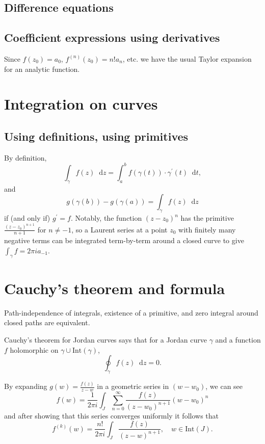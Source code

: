 \documentclass{article}
\newcommand\dif{\mathop{}\!\mathrm{d}}
\begin{document}
\subsection{Difference equations}

\subsection{Coefficient expressions using derivatives}
Since $f(z_0) = a_0$, $f^{(n)}(z_0) = n! a_n$, etc.
we have the usual Taylor expansion for an analytic function.


\section{Integration on curves}

\subsection{Using definitions, using primitives}
By definition,
$$
  \int_\gamma
    f(z)
    \dif z
= \int_a^b
    f(\gamma(t)) \cdot \gamma^\prime(t)
    \dif t,
$$
and
$$
  g(\gamma(b)) - g(\gamma(a))
= \int_\gamma
    f(z) \dif z
$$
if (and only if) $g^\prime = f$. Notably, the function $(z - z_0)^n$ has the
primitive $\frac{(z - z_0)^{n+1}}{n + 1}$ for $n \neq -1$, so a Laurent series
at a point $z_0$ with finitely many negative terms can be integrated
term-by-term around a closed curve to give $\int_\gamma f = 2 \pi i a_{-1}$.


\section{Cauchy's theorem and formula}

Path-independence of integrals, existence of a primitive,
and zero integral around closed paths are equivalent.

Cauchy's theorem for Jordan curves says that for a Jordan
curve $\gamma$ and a function $f$ holomorphic on
$\gamma \cup \mathrm{Int}(\gamma)$,
$$
  \oint_\gamma
    f(z)
    \dif z
= 0.
$$

By expanding $g(w) = \frac{f(z)}{z - w}$ in a geometric series in $(w
- w_0)$, we can see
$$
  f(w)
= \frac{1}{2 \pi i}
  \int_J
    \sum_{n=0}^\infty
      \frac{f(z)}{(z - w_0)^{n+1}}
      (w - w_0)^n
$$
and after showing that this series converges uniformly it follows that
$$
  f^{(k)}(w)
= \frac{n!}{2 \pi i}
  \int_J
    \frac{f(z)}
         {(z - w)^{n+1}}, \quad w \in \mathrm{Int}(J).
$$
\end{document}
